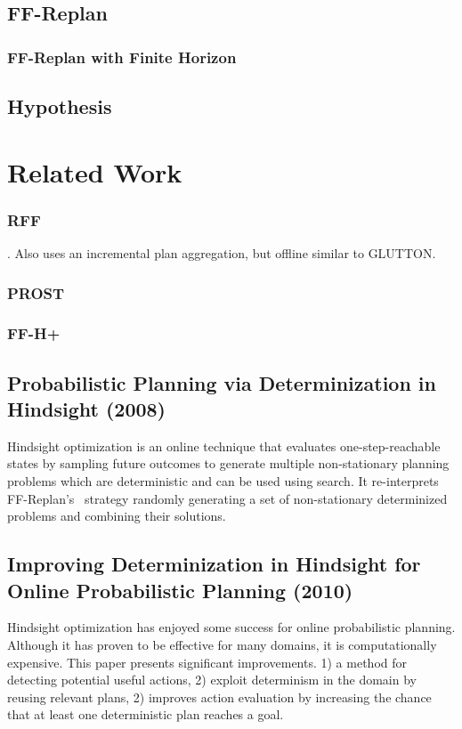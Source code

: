 \documentclass[runningheads,a4paper]{llncs}
\begin{document}
\subsection{FF-Replan}

\subsubsection{FF-Replan with Finite Horizon}

\subsection{Hypothesis}


\section{Related Work}

\subsubsection{RFF}. Also uses an incremental plan aggregation, but offline similar to GLUTTON. 

\subsubsection{PROST}

\subsubsection{FF-H+}


\subsection{Probabilistic Planning via Determinization in Hindsight (2008)~\cite{yoon2008probabilistic}}

Hindsight optimization is an online technique that evaluates one-step-reachable
states by sampling future outcomes to generate multiple non-stationary planning
problems which are deterministic and can be used using search. It re-interprets
FF-Replan's~\cite{FFReplan} strategy randomly generating a set of non-stationary
determinized problems and combining their solutions.

\subsection{Improving Determinization in Hindsight for Online Probabilistic Planning (2010)~\cite{yoon2010improving}}
Hindsight optimization has enjoyed some success for online probabilistic
planning. Although it has proven to be effective for many domains, it is
computationally expensive. This paper presents significant improvements.  1) a
method for detecting potential useful actions, 2) exploit determinism in the
domain by reusing relevant plans, 2) improves action evaluation by increasing
the chance that at least one deterministic plan reaches a goal.
\end{document}
